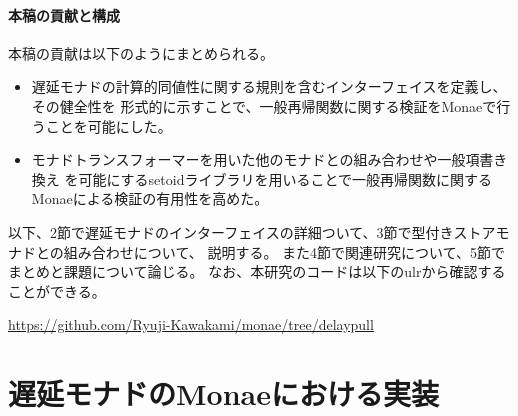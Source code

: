 \documentclass[japanese]{jssst_ppl}
\theoremstyle{definition}
\begin{document}
\paragraph{本稿の貢献と構成}
本稿の貢献は以下のようにまとめられる。
\begin{itemize}
  \item 遅延モナドの計算的同値性に関する規則を含むインターフェイスを定義し、その健全性を
        形式的に示すことで、一般再帰関数に関する検証をMonaeで行うことを可能にした。
  \item モナドトランスフォーマーを用いた他のモナドとの組み合わせや一般項書き換え
        を可能にするsetoidライブラリを用いることで一般再帰関数に関するMonaeによる検証の有用性を高めた。
\end{itemize}
以下、2節で遅延モナドのインターフェイスの詳細ついて、3節で型付きストアモナドとの組み合わせについて、
説明する。
また4節で関連研究について、5節でまとめと課題について論じる。
なお、本研究のコードは以下のulrから確認することができる。\\
\begin{center}
  \url{https://github.com/Ryuji-Kawakami/monae/tree/delaypull}
\end{center}

\section{遅延モナドのMonaeにおける実装}
\end{document}
